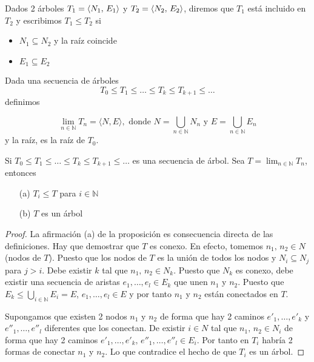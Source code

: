 \begin{definition}
Dados 2 árboles $T_{1}=\langle N_{1}, \, E_{1} \rangle$ y $T_{2}=\langle N_{2}, \, E_{2} \rangle$, diremos que $T_1$ está incluido en $T_2$ y escribimos $T_1 \leq T_2$ si 
\begin{itemize}
	\item $N_1 \subseteq N_2$ y la raíz coincide
	\item $E_1 \subseteq E_2$
\end{itemize}
\end{definition}
\begin{definition}
Dada una secuencia de árboles 
\[ T_0 \leq T_1 \leq \ldots \leq T_k \leq T_{k+1} \leq \ldots \]
definimos
\end{definition}
\[ \lim_{n \in \mathbb{N}} T_n = \langle N,E \rangle, \mbox{ donde } N= \bigcup_{n\in \mathbb{N}} N_n \mbox{ y } E= \bigcup_{n\in \mathbb{N}} E_n  \]
y la raíz, es la raíz de $T_0$.
\begin{prop} Si $T_0 \leq T_1 \leq \ldots \leq T_k \leq T_{k+1} \leq \ldots$ es una secuencia de árbol. Sea $T= \lim_{n \in \mathbb{N}} T_n$, entonces 
\begin{itemize}
	\item[(a)] $T_i \leq T$ para $i \in \mathbb{N}$
	\item[(b)] $T$ es un árbol
\end{itemize}
\end{prop}
\begin{proof}
La afirmación (a) de la proposición es consecuencia directa de las definiciones. Hay que demostrar que $T$ es conexo. En efecto, tomemos $n_1, \, n_2 \in N$ (nodos de $T$). Puesto que los nodos de $T$ es la unión de todos los nodos y $N_i \subseteq N_j$ para $j>i$. Debe existir $k$ tal que $n_1, \, n_2 \in N_k$. Puesto que $N_k$ es conexo, debe existir una secuencia de aristas $e_1, \ldots, e_l \in E_k$ que unen $n_1$ y $n_2$. Puesto que $E_k \leq \bigcup_{i \in \mathbb{N}}E_i=E$, $e_1, \ldots, e_l \in E$ y por tanto $n_1$ y $n_2$ están conectados en $T$.

Supongamos que existen 2 nodos $n_1$ y $n_2$ de forma que hay 2 caminos $e'_1, \ldots, e'_k$ y $e''_1, \ldots, e''_l$ diferentes que los conectan. De existir $i \in N$ tal que $n_1, \, n_2 \in N_i$ de forma que hay 2 caminos $e'_1, \ldots, e'_k, \, e''_1, \ldots, e''_l \in E_i$. Por tanto en $T_i$ habría 2 formas de conectar $n_1$ y $n_2$. Lo que contradice el hecho de que $T_i$ es un árbol. 
\end{proof}
